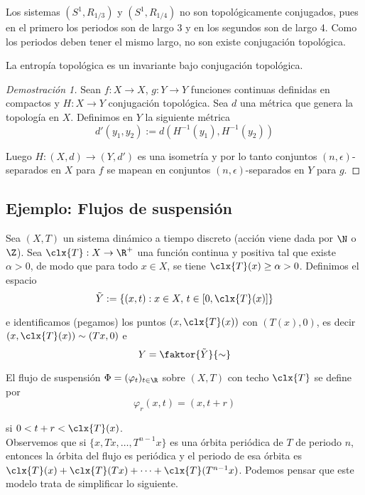 \documentclass[	docname= Sistemas\ Din\'amicos,
				finished=1,
				semester=1,
				year=2017,
				professor=Godofredo\ Iommi,
				sigla=MAT2565]{apunte}
\begin{document}
\begin{ex} Los sistemas $(S^{1}, R_{1/3})$ y $(S^{1}, R_{1/4})$ no son topológicamente conjugados, pues en el primero los periodos son de largo 3 y en los segundos son de largo 4. Como los periodos deben tener el mismo largo, no son existe conjugación topológica.
\end{ex}

\begin{teo} La entropía topológica es un invariante bajo conjugación topológica.
\end{teo}

\begin{proof}[Demostración 1] Sean $f: X \to X$, $g: Y \to Y$ funciones continuas definidas en compactos y $H:X \to Y$ conjugación topológica. Sea $d$ una métrica que genera la topología en $X$. Definimos en $Y$ la siguiente métrica
	$$d'(y_{1}, y_{2}) := d(H^{-1}(y_{1}), H^{-1}(y_{2}))$$

Luego $H: (X,d) \to (Y, d')$ es una isometría y por lo tanto conjuntos $(n,\epsilon)$-separados en $X$ para $f$ se mapean en conjuntos $(n,\epsilon)$-separados en $Y$ para $g$.
\end{proof}

\subsection{Ejemplo: Flujos de suspensión}
Sea $(X,T)$ un sistema dinámico a tiempo discreto (acción viene dada por $\N$ o $\Z$). Sea $\clx{T}: X \to \R^{+}$ una función continua y positiva tal que existe $\alpha > 0$, de modo que para todo $x \in X$, se tiene $\clx{T}(x) \geq \alpha > 0$. Definimos el espacio
	$$\tilde{Y} := \{(x,t) : x \in X, \, t \in [0,\clx{T}(x)] \}$$

e identificamos (pegamos) los puntos $(x, \clx{T}(x))$ con $(T(x), 0)$, es decir $(x, \clx{T}(x)) \sim (Tx, 0)$ e
	$$Y = \faktor{\tilde{Y}}{\sim}$$

El flujo de suspensión $\Phi = (\varphi_{t})_{t \in \R}$ sobre $(X,T)$ con techo $\clx{T}$ se define por
	$$\varphi_{r}(x, t) = (x, t+r)$$

si $0 < t+r < \clx{T}(x)$.	\\

Observemos que si $\{x, Tx, \ldots, T^{n-1}x\}$ es una órbita periódica de $T$ de periodo $n$, entonces la órbita del flujo es periódica y el periodo de esa órbita es $\clx{T}(x) + \clx{T}(Tx) + \cdots + \clx{T}(T^{n-1}x)$. Podemos pensar que este modelo trata de simplificar lo siguiente.	\\
\end{document}

